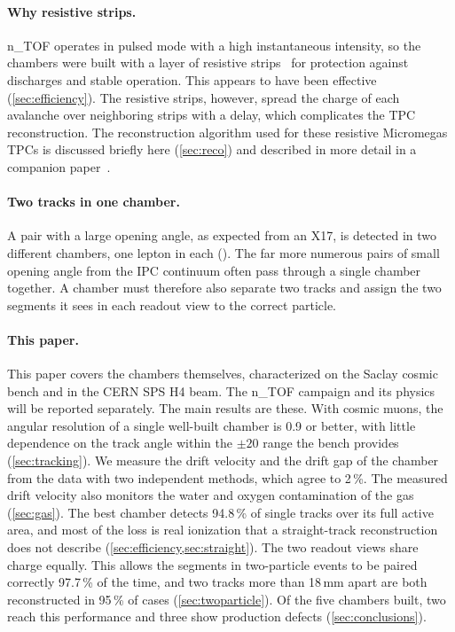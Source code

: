 \paragraph{Why resistive strips.}
n\_TOF operates in pulsed mode with a high instantaneous intensity, so the chambers were built with a layer of resistive strips~\cite{Alexopoulos2011} for protection against discharges and stable operation. This appears to have been effective
(\cref{sec:efficiency}). The resistive strips, however, spread the charge of each avalanche over neighboring strips
with a delay, which complicates the TPC reconstruction. The reconstruction algorithm used for these resistive
Micromegas TPCs is discussed briefly here (\cref{sec:reco}) and described in more detail in a companion paper~\cite{paperII}.

\paragraph{Two tracks in one chamber.}
A pair with a large opening angle, as expected from an X17, is detected in two different chambers, one lepton in each (). The far more
numerous pairs of small opening angle from the IPC continuum often pass through a single chamber together. A chamber must
therefore also separate two tracks and assign the two segments it sees in each readout view to the correct particle.

\paragraph{This paper.}
This paper covers the chambers themselves, characterized on the Saclay cosmic bench and in the CERN SPS H4 beam. The n\_TOF
campaign and its physics will be reported separately. The main results are these. With cosmic muons, the angular resolution of a single well-built chamber
is 0.9\textdegree{} or better, with little dependence on
the track angle within the $\pm20$\textdegree{} range the bench provides (\cref{sec:tracking}). We measure the drift velocity and the drift gap of the chamber from the data with two
independent methods, which agree to 2\,\%. The measured drift velocity also monitors the water and oxygen contamination of the gas (\cref{sec:gas}). The best
chamber detects 94.8\,\% of single tracks over its full active area, and most of the loss is real ionization that a straight-track reconstruction does not describe (\cref{sec:efficiency,sec:straight}). The two
readout views share charge equally. This allows the segments in two-particle events to be paired correctly 97.7\,\% of the time, and two
tracks more than 18\,mm apart are both reconstructed in 95\,\% of cases (\cref{sec:twoparticle}). Of the five chambers built, two reach this performance and three show production defects
(\cref{sec:conclusions}).


